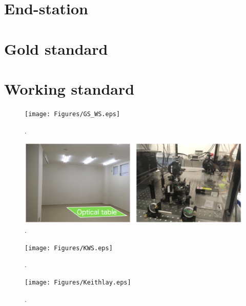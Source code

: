 \section{End-station}
\section{Gold standard}
\section{Working standard}

\begin{figure}
\begin{center}
\texttt{[image: Figures/GS\_WS.eps]}
\caption{.} 
\label{fig:GS_WS} 
\end{center}
\end{figure}

\begin{figure}
\begin{center}
\includegraphics[width=14cm]{Figures/Toyama.eps}
\caption{.} 
\label{fig:Toyama} 
\end{center}
\end{figure}

\begin{figure}
\begin{center}
\texttt{[image: Figures/KWS.eps]}
\caption{.} 
\label{fig:KWS} 
\end{center}
\end{figure}

\begin{figure}
\begin{center}
\texttt{[image: Figures/Keithlay.eps]}
\caption{.} 
\label{fig:Keithlay} 
\end{center}
\end{figure}